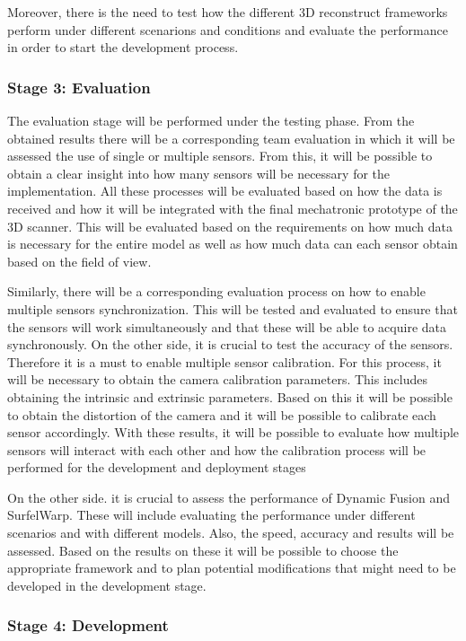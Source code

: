 \documentclass[12pt]{report}
\begin{document}
Moreover, there is the need to test how the different 3D reconstruct frameworks perform under different scenarions and conditions and evaluate the performance in order to start the development process.

\subsubsection{Stage 3: Evaluation}

The evaluation stage will be performed under the testing phase. From the obtained results there will be a corresponding team evaluation in which it will be assessed the use of single or multiple sensors. 
From this, it will be possible to obtain a clear insight into how many sensors will be necessary for the implementation. All these processes will be evaluated based on how the data is received and how it will be integrated with the final mechatronic prototype of the 3D scanner. 
This will be evaluated based on the requirements on how much data is necessary for the entire model as well as how much data can each sensor obtain based on the field of view.

Similarly, there will be a corresponding evaluation process on how to enable multiple sensors synchronization. This will be tested and evaluated to ensure that the sensors will work simultaneously and that these will be able to acquire data synchronously. 
On the other side, it is crucial to test the accuracy of the sensors. Therefore it is a must to enable multiple sensor calibration. For this process, it will be necessary to obtain the camera calibration parameters. This includes obtaining the intrinsic and extrinsic parameters. 
Based on this it will be possible to obtain the distortion of the camera and it will be possible to calibrate each sensor accordingly.
With these results, it will be possible to evaluate how multiple sensors  will interact with each other and how the calibration process will be performed for the development and deployment stages

On the other side. it is crucial to assess the performance of Dynamic Fusion and SurfelWarp. 
These will include evaluating the performance under different scenarios and with different models. Also, the speed, accuracy and results will be assessed. 
Based on the results on these it will be possible to choose the appropriate framework and to plan potential modifications that might need to be developed in the development stage.


\subsubsection{Stage 4: Development}
\end{document}
